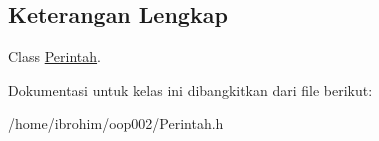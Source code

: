 \subsection{Keterangan Lengkap}
Class \hyperlink{classPerintah}{Perintah}. 

Dokumentasi untuk kelas ini dibangkitkan dari file berikut\+:\begin{DoxyCompactItemize}
\item 
/home/ibrohim/oop002/Perintah.\+h\end{DoxyCompactItemize}

